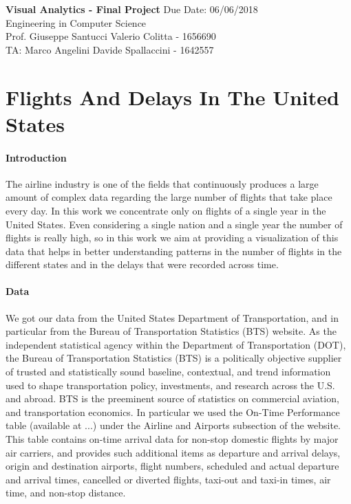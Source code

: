 \documentclass[a4paper, 12pt]{article}
\begin{document}
\noindent
\large\textbf{Visual Analytics - Final Project} \normalsize \hfill Due Date: 06/06/2018 \\
\normalsize Engineering in Computer Science   \\
Prof. Giuseppe Santucci \hfill Valerio Colitta - 1656690 \\
TA: Marco Angelini \hfill Davide Spallaccini - 1642557

\section*{Flights And Delays In The United States}

\paragraph{Introduction}
The airline industry is one of the fields that continuously produces a large amount of complex data
regarding the large number of flights that take place every day. In this work we concentrate only on
flights of a single year in the United States. Even considering a single nation and a single year the
number of flights is really high, so in this work we aim at providing a visualization of this data that
helps in better understanding patterns in the number of flights in the different states and in the 
delays that were recorded across time.

\paragraph*{Data}
We got our data from the United States Department of Transportation, and in particular from the 
Bureau of Transportation Statistics (BTS) website. As the independent statistical agency within the
Department of Transportation (DOT), the Bureau of Transportation Statistics (BTS) is a politically
objective supplier of trusted and statistically sound baseline, contextual, and trend information used
to shape transportation policy, investments, and research across the U.S. and abroad. BTS is the
preeminent source of statistics on commercial aviation, and transportation economics.
In particular we used the On-Time Performance table (available at ...) under the Airline and Airports
subsection of the website. This table contains on-time arrival data for non-stop domestic flights by
major air carriers, and provides such additional items as departure and arrival delays, origin and
destination airports, flight numbers, scheduled and actual departure and arrival times, cancelled or
diverted flights, taxi-out and taxi-in times, air time, and non-stop distance.
\\
\end{document}
